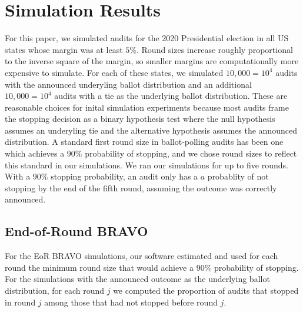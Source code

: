 \documentclass[runningheads]{llncs}
\begin{document}
\section{Simulation Results}

For this paper, we simulated audits for 
the 2020 Presidential election
in all US states whose margin was at least $5\%$.
Round sizes increase roughly proportional to the inverse
square of the margin, so 
smaller margins are computationally more expensive to simulate.
For each of these states, we simulated 
$10,000=10^4$ audits with the announced
underyling ballot distribution
and an additional $10,000=10^4$ audits with a tie
as the underlying ballot distribution.
These are reasonable choices for inital simulation experiments
because most audits frame the stopping decision as a binary
hypothesis test where the null hypothesis assumes an underyling tie
and the alternative hypothesis assumes the announced distribution.
A standard first round size in ballot-polling audits
has been one which achieves a $90\%$ probability
of stopping, and we chose round sizes to reflect this standard
in our simulations.
We ran our simulations for up to five rounds.
With a $90\%$ stopping probability, 
an audit only has a $a$ probablity of not stopping
by the end of the fifth round, assuming the outcome was correctly
announced.

\subsection{End-of-Round BRAVO}
For the EoR BRAVO simulations, our software estimated and used for each round
the minimum round size that would achieve a $90\%$ probability of stopping.
For the simulations with the announced outcome as the underlying
ballot distribution, for each round $j$ we computed the proportion of audits 
that stopped in round $j$ among those that had not stopped before round $j$.
\end{document}
